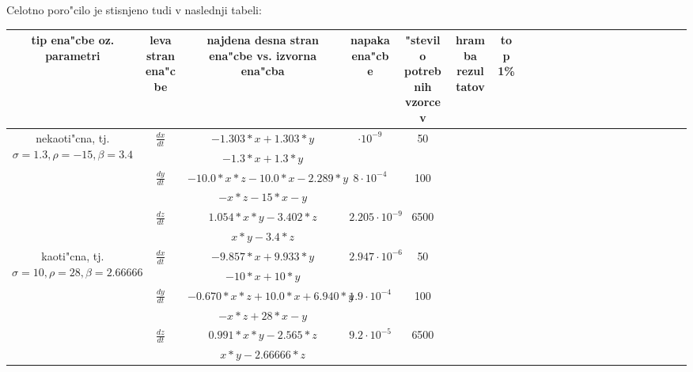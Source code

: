 \documentclass[10pt,a4paper]{article}
\begin{document}
Celotno poro"cilo je stisnjeno tudi v naslednji tabeli:
\begin{table}[h]
	\begin{tabular}{cc *{15}{c}ccccc}
		\multicolumn{1}{p{1cm}|}{tip ena"cbe oz. parametri} & 
		\multicolumn{1}{p{1cm}|}{leva stran ena"cbe} &
		 \multicolumn{1}{p{5cm}|}{najdena desna stran ena"cbe vs. izvorna ena"cba} &
		  \multicolumn{1}{p{2cm}|}{napaka ena"cbe} &
		   \multicolumn{1}{p{1cm}|}{"stevilo potrebnih vzorcev} & 
		   \multicolumn{1}{p{1cm}|}{hramba rezultatov} & \multicolumn{1}{p{1cm}|}{top 1\%} \\
		   \hline
		\multirow{6}{1.5cm}{nekaoti"cna, tj. $\sigma=1.3, \rho=-15, \beta=3.4$} & \multirow{2}{1.5cm}{$\frac{dx}{dt}$} & $ -1.303*x + 1.303*y $ & $\cdot 10^{-9}$ & 50 & &  \\
								 & & $ -1.3*x + 1.3*y $ & & & \\
								\cline{3-6}
		 & \multirow{2}{1.5cm}{$\frac{dy}{dt}$} & $-10.0*x*z - 10.0*x - 2.289*y$ & $8\cdot 10^{-4}$ & 100 &  \\
								 & & $ -x*z -15*x -y $ & & & \\
								\cline{3-6}
		& \multirow{2}{1.5cm}{$\frac{dz}{dt}$} & $1.054*x*y - 3.402*z$ & $2.205\cdot 10^{-9}$ & 6500 \\
								 & & $ x*y - 3.4*z $ & & & \\
		\hline
		\multirow{6}{1.5cm}{kaoti"cna, tj. $\sigma=10, \rho=28, \beta=2.66666$} & \multirow{2}{1.5cm}{$\frac{dx}{dt}$} & $-9.857*x + 9.933*y$ & $2.947\cdot 10^{-6}$  & 50 \\
								 & & $ -10*x + 10*y $ & & & \\
								\cline{3-6}
		& \multirow{2}{1.5cm}{$\frac{dy}{dt}$} & $ -0.670*x*z + 10.0*x + 6.940*y $ & $ 1.9\cdot 10^ {-4}$ & 100 \\
								 & & $ -x*z + 28*x -y $ & & & \\
								\cline{3-6}
		& \multirow{2}{1.5cm}{$\frac{dz}{dt}$} & $0.991*x*y - 2.565*z$ & $9.2\cdot 10^ {-5}$ & 6500 \\
								 & & $ x*y - 2.66666*z $ & & & \\
	\end{tabular}
\end{table}


\end{document}
